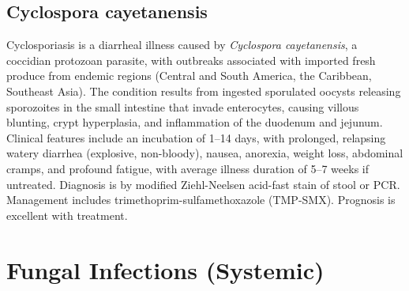 \label{sec:Foodborne and Waterborne Parasites}

\subsection{Cyclospora cayetanensis}
\label{sec:Cyclospora}
Cyclosporiasis is a diarrheal illness caused by \textit{Cyclospora cayetanensis}, a coccidian protozoan parasite, with outbreaks associated with imported fresh produce from endemic regions (Central and South America, the Caribbean, Southeast Asia). The condition results from ingested sporulated oocysts releasing sporozoites in the small intestine that invade enterocytes, causing villous blunting, crypt hyperplasia, and inflammation of the duodenum and jejunum. Clinical features include an incubation of 1--14 days, with prolonged, relapsing watery diarrhea (explosive, non-bloody), nausea, anorexia, weight loss, abdominal cramps, and profound fatigue, with average illness duration of 5--7 weeks if untreated. Diagnosis is by modified Ziehl-Neelsen acid-fast stain of stool or PCR. Management includes trimethoprim-sulfamethoxazole (TMP-SMX). Prognosis is excellent with treatment.

\section{Fungal Infections (Systemic)}








\label{sec:Fungal Infections (Systemic)}

